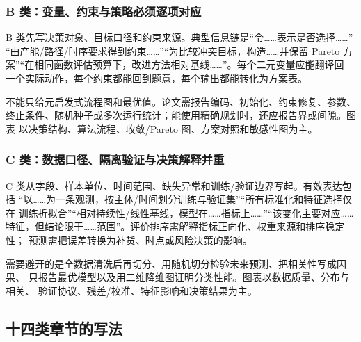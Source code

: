 \documentclass[UTF8,a4paper,12pt]{ctexart}
\begin{document}
{\subsubsection{B 类：变量、约束与策略必须逐项对应}

B 类先写决策对象、目标口径和约束来源。典型信息链是“令……表示是否选择……”
“由产能/路径/时序要求得到约束……”“为比较冲突目标，构造……并保留 Pareto
方案”“在相同函数评估预算下，改进方法相对基线……”。每个二元变量应能翻译回
一个实际动作，每个约束都能回到题意，每个输出都能转化为方案表。

不能只给元启发式流程图和最优值。论文需报告编码、初始化、约束修复、参数、
终止条件、随机种子或多次运行统计；能使用精确规划时，还应报告界或间隙。图表
以决策结构、算法流程、收敛/Pareto 图、方案对照和敏感性图为主。

\subsubsection{C 类：数据口径、隔离验证与决策解释并重}

C 类从字段、样本单位、时间范围、缺失异常和训练/验证边界写起。有效表达包括
“以……为一条观测，按主体/时间划分训练与验证集”“所有标准化和特征选择仅在
训练折拟合”“相对持续性/线性基线，模型在……指标上……”“该变化主要对应……
特征，但结论限于……范围”。评价排序需解释指标正向化、权重来源和排序稳定性；
预测需把误差转换为补货、时点或风险决策的影响。

需要避开的是全数据清洗后再切分、用随机切分检验未来预测、把相关性写成因果、
只报告最优模型以及用二维降维图证明分类性能。图表以数据质量、分布与相关、
验证协议、残差/校准、特征影响和决策结果为主。

\subsection{十四类章节的写法}

}
\end{document}

